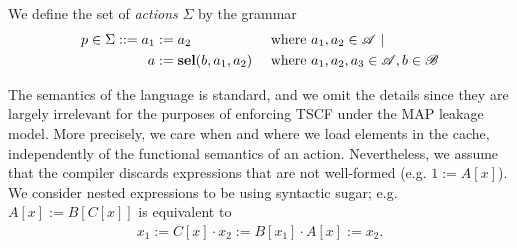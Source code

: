 We define the set of \emph{actions} $\Sigma$ by the grammar
{\small{\begin{align*}      
p\in \Sigma::=
a_1&:=a_2& &\text{ where $a_1,a_2\in \mathscr{A}$}\ |\ \\
a&:=\textbf{sel}(b,a_1,a_2)&&\text{ where $a_1,a_2,a_3\in \mathscr{A}, b\in \mathscr{B}$} 
\end{align*}}}

The semantics of the language is standard, and we omit the details since they are largely irrelevant for the purposes of enforcing TSCF under the MAP leakage model. More precisely, we care when and where we load elements in the cache, independently of the functional semantics of an action. Nevertheless, we assume that the compiler discards expressions that are not well-formed (e.g. $1:=A[x]$). We consider nested expressions to be using syntactic sugar; e.g. $A[x]:=B[C[x]]$ is equivalent to
\begin{align*}
    x_1:=C[x]\cdot x_2:=B[x_1]\cdot A[x]:=x_2.
\end{align*}






